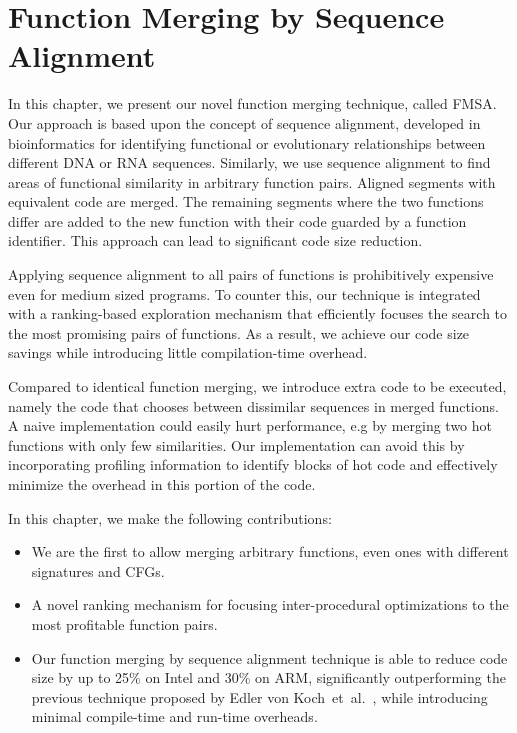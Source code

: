 
\chapter{Function Merging by Sequence Alignment} \label{chp:cgo19}

In this chapter, we present our novel function merging technique, called FMSA.
Our approach is based upon the concept of sequence alignment, developed in
bioinformatics for identifying functional or evolutionary relationships between
different DNA or RNA sequences. Similarly, we use sequence alignment to find
areas of functional similarity in arbitrary function pairs. Aligned segments
with equivalent code are merged. The remaining segments where the two functions
differ are added to the new function with their code guarded by a
function identifier. This approach can lead to significant code size reduction.

Applying sequence alignment to all pairs of functions is prohibitively expensive
even for medium sized programs. To counter this, our technique is integrated with
a ranking-based exploration mechanism that efficiently focuses the search to the most
promising pairs of functions. %
As a result, we achieve our code size savings while introducing little compilation-time
overhead.

Compared to identical function merging, we introduce extra code to be executed,
namely the code that chooses between dissimilar sequences in merged functions.
A naive implementation could easily hurt performance, e.g by merging two hot functions
with only few similarities. Our implementation can avoid this by incorporating
profiling information to identify blocks of hot code and effectively minimize 
the overhead in this portion of the code.

In this chapter, we make the following contributions:
\begin{itemize}
  \item We are the first to allow merging arbitrary functions, even ones with
    different signatures and CFGs.
  \item A novel ranking mechanism for focusing inter-procedural optimizations
    to the most profitable function pairs.
  \item Our function merging by sequence alignment technique is able to reduce
     code size by up to 25\% on Intel and 30\% on ARM, significantly outperforming the
    previous technique proposed by Edler von Koch~et~al.~\cite{edler14}, while introducing minimal compile-time and run-time overheads.
\end{itemize}







